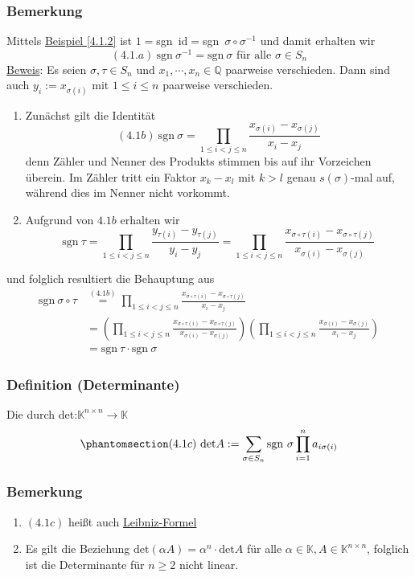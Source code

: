 \subsubsection{Bemerkung}
Mittels \hyperref[4.1.2]{Beispiel \ref*{4.1.2}} ist $1=$sgn~id$=$sgn~$\sigma \circ \sigma ^{-1}$ und damit erhalten wir
\[\label{4.1a} (4.1.a)\ \mathrm{sgn~}\sigma ^{-1}=\mathrm{sgn~}\sigma\text{ für alle }\sigma \in S_n\]
\underline{Beweis}: Es seien $\sigma ,\tau \in S_n$ und $x_1,\cdots ,x_n\in\mathbb{Q}$ paarweise verschieden.  Dann sind auch $y_i:=x_{\sigma (i)}$ mit $1\leq i\leq n$ paarweise verschieden.
\renewcommand{\labelenumi}{(\Roman{enumi})}
\begin{enumerate}
\item Zunächst gilt die Identität
\[\label{4.1b} (4.1b)\ \mathrm{sgn~}\sigma =\prod _{1 \leq i<j \leq n} \frac{x_{\sigma (i)}-x_{\sigma (j)}}{x_i -x_j}\]
denn Zähler und Nenner des Produkts stimmen bis auf ihr Vorzeichen überein.  Im Zähler tritt ein Faktor $x_k -x_l$ mit $k>l$ genau $s(\sigma )$-mal auf, während dies im Nenner nicht vorkommt.
\item Aufgrund von \hyperref[4.1b]{$4.1b$} erhalten wir
\[\mathrm{sgn~}\tau =\prod _{1\leq i<j\leq n} \frac{y_{\tau (i)} -y_{\tau (j)}}{y_i - y_j}=\prod _{1\leq i<j\leq n} \frac{x_{\sigma \circ \tau (i)}-x_{\sigma \circ \tau (j)}}{x_{\sigma (i)}-x_{\sigma (j)}}\]
\end{enumerate}
und folglich resultiert die Behauptung aus
\begin{align*}
\mathrm{sgn~} \sigma\circ\tau &\stackrel{(4.1b)}{=} \prod _{1\leq i<j\leq n}\frac{x_{\sigma \circ \tau (i)}-x_{\sigma\circ\tau (j)}}{x_i -x_j}\\
&= \left(\prod _{1\leq i<j\leq n} \frac{x_{\sigma\circ\tau (i)}-x_{\sigma\circ\tau (j)}}{x_{\sigma (i)}-x_{\sigma (j)}}\right) \left(\prod _{1\leq i<j\leq n}\frac{x_{\sigma (i)}-x_{\sigma (j)}}{x_i-x_j}\right)\\
&= \mathrm{sgn~}\tau \cdot \mathrm{sgn~}\sigma
\end{align*}
\subsubsection{Definition (Determinante)}
Die durch det:$\mathbb{K}^{n\times n}\rightarrow \mathbb{K}$
\[\phantomsection\label{4.1c}(4.1c)\ \mathrm{det}A:=\sum _{\sigma\in S_n} \mathrm{sgn~}\sigma \prod _{i=1}^na_{i\sigma (i)}\]
\subsubsection{Bemerkung}
\renewcommand{\labelenumi}{(\arabic{enumi})}
\begin{enumerate}
\item \hyperref[4.1c]{$(4.1c)$} heißt auch \underline{Leibniz-Formel}
\item Es gilt die Beziehung $\mathrm{det}(\alpha A)=\alpha ^n\cdot\mathrm{det}A$ für alle $\alpha\in\mathbb{K},A\in\mathbb{K}^{n\times n}$, folglich ist die Determinante für $n\geq 2$ nicht linear.
\end{enumerate}
